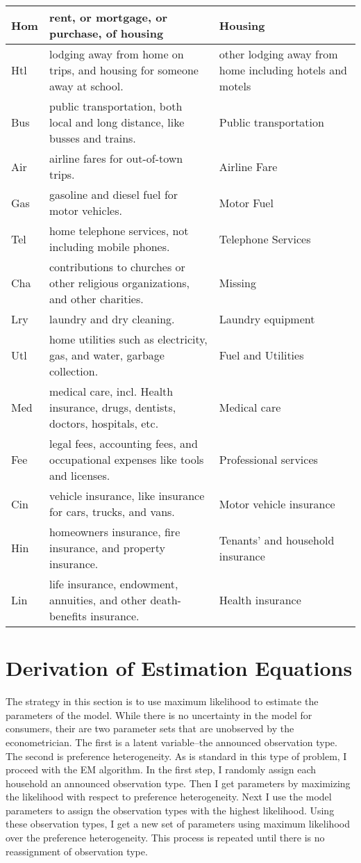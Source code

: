 \documentclass{article}
\begin{document}
\begin{sideways}
\begin{tabular}{|l|l|l|}
\hline
Hom & rent, or mortgage, or purchase, of housing & Housing\\ 
\hline
Htl & lodging away from home on trips, and housing for someone away at school. & other lodging away from home including hotels and motels\\ 
\hline
Bus & public transportation, both local and long distance, like busses and trains. & Public transportation\\ 
\hline
Air & airline fares for out-of-town trips. & Airline Fare\\ 
\hline
Gas & gasoline and diesel fuel for motor vehicles. & Motor Fuel\\ 
\hline
Tel & home telephone services, not including mobile phones. & Telephone Services\\ 
\hline
Cha & contributions to churches or other religious organizations, and other charities. & Missing\\ 
\hline
Lry & laundry and dry cleaning. & Laundry equipment\\ 
\hline
Utl & home utilities such as electricity, gas, and water, garbage collection. & Fuel and Utilities\\ 
\hline
Med & medical care, incl. Health insurance, drugs, dentists, doctors, hospitals, etc. & Medical care\\ 
\hline
Fee & legal fees, accounting fees, and occupational expenses like tools and licenses. & Professional services\\ 
\hline
Cin & vehicle insurance, like insurance for cars, trucks, and vans. & Motor vehicle insurance\\ 
\hline
Hin & homeowners insurance, fire insurance, and property insurance. & Tenants' and household insurance\\ 
\hline
Lin & life insurance, endowment, annuities, and other death-benefits insurance. & Health insurance\\ 
\hline
\end{tabular}
\end{sideways}

\section{Derivation of Estimation Equations}
The strategy in this section is to use maximum likelihood to estimate the parameters of the model.  
While there is no uncertainty in the model for consumers, their are two parameter sets that are unobserved by the econometrician.
The first is a latent variable--the announced observation type.
The second is preference heterogeneity.
As is standard in this type of problem, I proceed with the EM algorithm.
In the first step, I randomly assign each household an announced observation type.
Then I get parameters by maximizing the likelihood with respect to preference heterogeneity.
Next I use the model parameters to assign the observation types with the highest likelihood.
Using these observation types, I get a new set of parameters using maximum likelihood over the preference heterogeneity.
This process is repeated until there is no reassignment of observation type.
\end{document}
